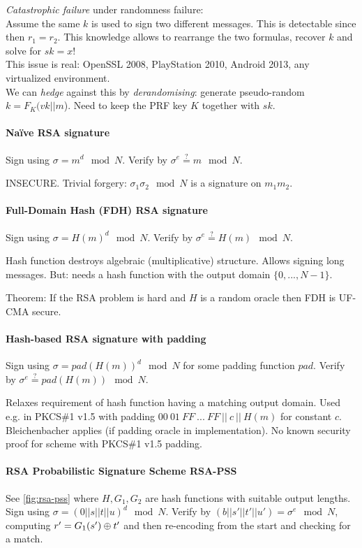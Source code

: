 \emph{Catastrophic failure} under randomness failure:
\\
Assume the same $k$ is used to sign two different messages.
This is detectable since then $r_1 = r_2$.
This knowledge allows to rearrange the two formulas, recover $k$ and solve for $sk=x$!
\\
This issue is real: OpenSSL 2008, PlayStation 2010, Android 2013, any virtualized environment.
\\
We can \emph{hedge} against this by \emph{derandomising}:
generate pseudo-random $k=F_K(vk||m$). Need to keep the PRF key $K$ together with $sk$.

\paragraph{Naïve RSA signature}
Sign using $\sigma = m^d \mod N$.
Verify by $\sigma^e \overset{?}{=} m \mod N$.

INSECURE.
Trivial forgery: $\sigma_1 \sigma_2 \mod N$ is a signature on $m_1 m_2$.

\paragraph{Full-Domain Hash (FDH) RSA signature}
Sign using $\sigma = H(m)^d \mod N$.
Verify by $\sigma^e \overset{?}{=} H(m) \mod N$.

Hash function destroys algebraic (multiplicative) structure.
Allows signing long messages.
But: needs a hash function with the output domain $\{0, ..., N-1\}$.

Theorem:
If the RSA problem is hard and $H$ is a random oracle then FDH is UF-CMA secure.

\paragraph{Hash-based RSA signature with padding}
Sign using $\sigma = pad(H(m))^d \mod N$ for some padding function $pad$.
Verify by $\sigma^e \overset{?}{=} pad(H(m)) \mod N$.

Relaxes requirement of hash function having a matching output domain.
Used e.g. in PKCS\#1 v1.5 with padding $00\ 01\ FF\ ...\ FF\ ||\ c\ ||\ H(m)$ for constant $c$.
\\
Bleichenbacher applies (if padding oracle in implementation).
No known security proof for scheme with PKCS\#1 v1.5 padding.

\paragraph{RSA Probabilistic Signature Scheme RSA-PSS}
See \autoref{fig:rsa-pss} where $H, G_1, G_2$ are hash functions with suitable output lengths.
\\
Sign using $\sigma = (0 || s || t || u)^d \mod N$.
Verify by $(b || s' || t' || u') = \sigma^e \mod N$,
computing $r' = G_1(s') \oplus t'$ and then re-encoding from the start and checking for a match.

